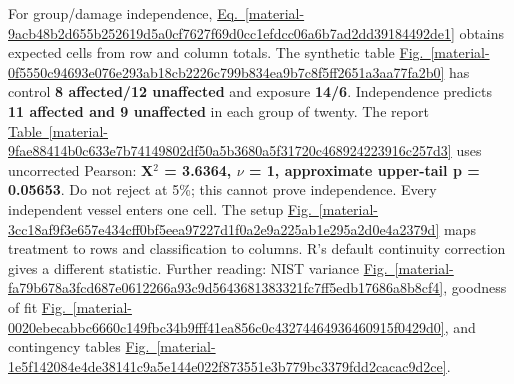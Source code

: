 \documentclass[11pt,a4paper]{article}
\begin{document}
For group/damage independence, \hyperref[material-9acb48b2d655b252619d5a0cf7627f69d0cc1efdcc06a6b7ad2dd39184492de1]{Eq.~\ref*{material-9acb48b2d655b252619d5a0cf7627f69d0cc1efdcc06a6b7ad2dd39184492de1}} obtains expected cells from row and column totals. The synthetic table \hyperref[material-0f5550c94693e076e293ab18cb2226c799b834ea9b7c8f5ff2651a3aa77fa2b0]{Fig.~\ref*{material-0f5550c94693e076e293ab18cb2226c799b834ea9b7c8f5ff2651a3aa77fa2b0}} has control \textbf{8 affected/12 unaffected} and exposure \textbf{14/6}. Independence predicts \textbf{11 affected and 9 unaffected} in each group of twenty. The report \hyperref[material-9fae88414b0c633e7b74149802df50a5b3680a5f31720c468924223916c257d3]{Table~\ref*{material-9fae88414b0c633e7b74149802df50a5b3680a5f31720c468924223916c257d3}} uses uncorrected Pearson: \textbf{X\ensuremath{{}^2} = 3.6364, \ensuremath{\nu} = 1, approximate upper-tail p = 0.05653}. Do not reject at 5\%; this cannot prove independence. Every independent vessel enters one cell. The setup \hyperref[material-3cc18af9f3e657e434cff0bf5eea97227d1f0a2e9a225ab1e295a2d0e4a2379d]{Fig.~\ref*{material-3cc18af9f3e657e434cff0bf5eea97227d1f0a2e9a225ab1e295a2d0e4a2379d}} maps treatment to rows and classification to columns. R's default continuity correction gives a different statistic. Further reading: NIST variance \hyperref[material-fa79b678a3fcd687e0612266a93c9d5643681383321fc7ff5edb17686a8b8cf4]{Fig.~\ref*{material-fa79b678a3fcd687e0612266a93c9d5643681383321fc7ff5edb17686a8b8cf4}}, goodness of fit \hyperref[material-0020ebecabbc6660c149fbc34b9fff41ea856c0c43274464936460915f0429d0]{Fig.~\ref*{material-0020ebecabbc6660c149fbc34b9fff41ea856c0c43274464936460915f0429d0}}, and contingency tables \hyperref[material-1e5f142084e4de38141c9a5e144e022f873551e3b779bc3379fdd2cacac9d2ce]{Fig.~\ref*{material-1e5f142084e4de38141c9a5e144e022f873551e3b779bc3379fdd2cacac9d2ce}}.
\end{document}
